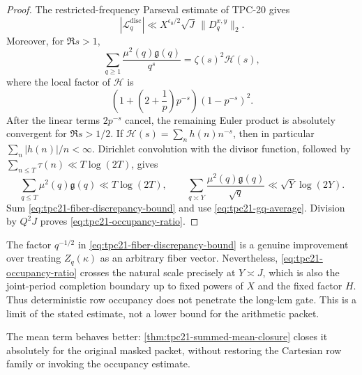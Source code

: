 \begin{proof}
The restricted-frequency Parseval estimate of TPC-20 gives
\[
 |\mathcal L_q^{\mathrm{disc}}|
 \ll X^{\epsilon_0/2}\sqrt J\,\|D_q^{x,y}\|_2.
\]
Moreover, for \(\Re s>1\),
\[
 \sum_{q\ge1}\frac{\mu^2(q)\mathfrak g(q)}{q^s}
 =\zeta(s)^2\mathcal H(s),
\]
where the local factor of \(\mathcal H\) is
\[
 \left(1+\left(2+\frac1p\right)p^{-s}\right)(1-p^{-s})^2.
\]
After the linear terms \(2p^{-s}\) cancel, the remaining Euler product
is absolutely convergent for \(\Re s>1/2\).  If
\(\mathcal H(s)=\sum_n h(n)n^{-s}\), then in particular
\(\sum_n|h(n)|/n<\infty\).  Dirichlet convolution with the divisor
function, followed by
\(\sum_{n\le T}\tau(n)\ll T\log(2T)\), gives
\begin{equation}
 \sum_{q\le T}\mu^2(q)\mathfrak g(q)\ll T\log(2T),
 \qquad
 \sum_{q\asymp Y}\frac{\mu^2(q)\mathfrak g(q)}{\sqrt q}
 \ll\sqrt Y\log(2Y).
 \label{eq:tpc21-gq-average}
\end{equation}
Sum \eqref{eq:tpc21-fiber-discrepancy-bound} and use
\eqref{eq:tpc21-gq-average}.  Division by \(Q^2J\) proves
\eqref{eq:tpc21-occupancy-ratio}.
\end{proof}

\begin{remark}
\label{rem:tpc21-occupancy-frontier}
The factor \(q^{-1/2}\) in
\eqref{eq:tpc21-fiber-discrepancy-bound} is a genuine improvement over
treating \(Z_q(\kappa)\) as an arbitrary fiber vector.  Nevertheless,
\eqref{eq:tpc21-occupancy-ratio} crosses the natural scale precisely at
\(Y\asymp J\), which is also the joint-period completion boundary up to
fixed powers of \(X\) and the fixed factor \(H\).  Thus deterministic
row occupancy does not penetrate the long-lcm gate.  This is a limit of
the stated estimate, not a lower bound for the arithmetic packet.
\end{remark}

The mean term behaves better: \cref{thm:tpc21-summed-mean-closure}
closes it absolutely for the original masked packet, without restoring
the Cartesian row family or invoking the occupancy estimate.
